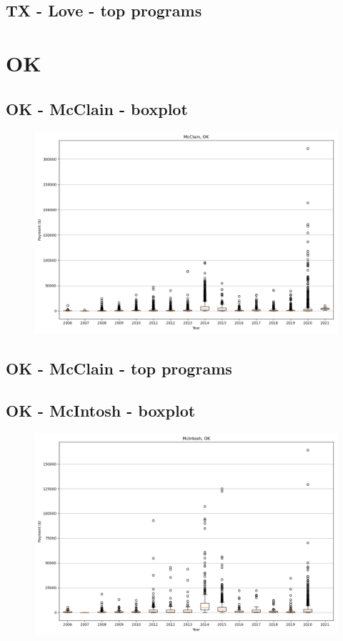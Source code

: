 \subsection*{TX - Love - top programs}

\newpage
\section*{OK}
\subsection*{OK - McClain - boxplot}
\begin{figure}[h]
\centering
\includegraphics[width=7in]{../output/boxplots/counties/McClain-OK_boxplot.png}
\end{figure}


\subsection*{OK - McClain - top programs}

\newpage
\subsection*{OK - McIntosh - boxplot}
\begin{figure}[h]
\centering
\includegraphics[width=7in]{../output/boxplots/counties/McIntosh-OK_boxplot.png}
\end{figure}



